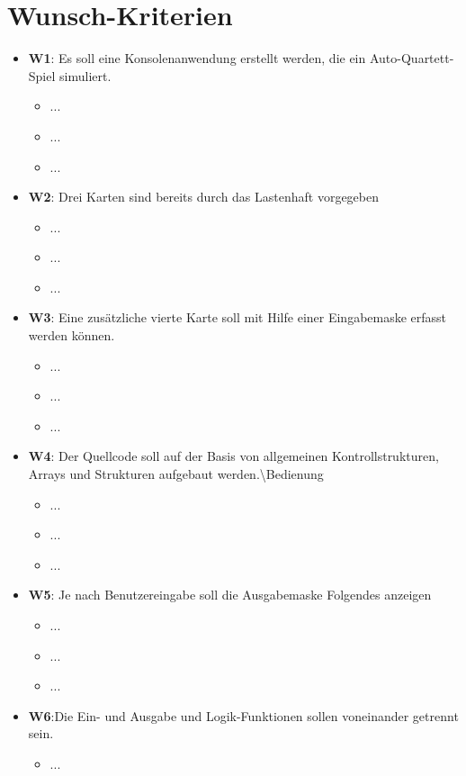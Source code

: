 \documentclass[11pt]{scrreprt}
\begin{document}
\section{Wunsch-Kriterien}
\begin{itemize}
\item \textbf{W1}: Es soll eine Konsolenanwendung erstellt werden, die ein Auto-Quartett-Spiel simuliert.
    \begin{itemize}
    \item ...
    \item ...
    \item ... 
    \end{itemize}
\item \textbf{W2}: Drei Karten sind bereits durch das Lastenhaft vorgegeben
    \begin{itemize}
    \item ...
    \item ...
    \item ... 
    \end{itemize}
\item \textbf{W3}: Eine zusätzliche vierte Karte soll mit Hilfe einer Eingabemaske erfasst werden können.
    \begin{itemize}
     \item ...
    \item ...
    \item ... 
    \end{itemize}
\item \textbf{W4}: Der Quellcode soll auf der Basis von allgemeinen Kontrollstrukturen, Arrays und Strukturen aufgebaut werden.\textbackslash Bedienung
    \begin{itemize}
    \item ...
    \item ...
    \item ... 
    \end{itemize}
\item \textbf{W5}: Je nach Benutzereingabe soll die Ausgabemaske Folgendes anzeigen
    \begin{itemize}
    \item ...
    \item ...
    \item ... 
    \end{itemize}
\item \textbf{W6}:Die Ein- und Ausgabe und Logik-Funktionen sollen voneinander getrennt sein.
    \begin{itemize}
    \item ...

\end{itemize}
\end{itemize}
\end{document}
